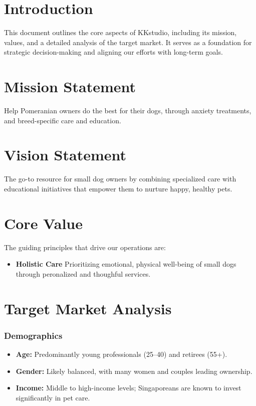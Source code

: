 \documentclass{businessdoc}
\begin{document}
\maketitle
\thispagestyle{empty} %

\section{Introduction}
This document outlines the core aspects of KKstudio, including its mission, values, and a detailed analysis of the target market. It serves as a foundation for strategic decision-making and aligning our efforts with long-term goals.

\section{Mission Statement}
Help Pomeranian owners do the best for their dogs, through anxiety treatments, and breed-specific care and education.

\section{Vision Statement}
The go-to resource for small dog owners by combining specialized care with educational initiatives that empower them to nurture happy, healthy pets.

\section{Core Value}
The guiding principles that drive our operations are:
\begin{itemize}
    \item \textbf{Holistic Care} Prioritizing emotional, physical well-being of small dogs through peronalized and thoughful services.
\end{itemize}

\section{Target Market Analysis}

\subsubsection{Demographics}
\begin{itemize}
    \item \textbf{Age:} Predominantly young professionals (25--40) and retirees (55+).
    \item \textbf{Gender:} Likely balanced, with many women and couples leading ownership.
    \item \textbf{Income:} Middle to high-income levels; Singaporeans are known to invest significantly in pet care.
\end{itemize}
\end{document}
